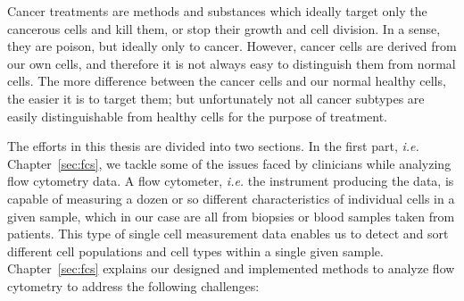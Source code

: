 Cancer treatments are methods and substances which ideally target only the
cancerous cells and kill them, or stop their growth and cell division. In a
sense, they are poison, but ideally only to cancer. However, cancer cells are
derived from our own cells, and therefore it is not always easy to distinguish
them from normal cells. The more difference between the cancer cells and our
normal healthy cells, the easier it is to target them; but unfortunately not
all cancer subtypes are easily distinguishable from healthy cells for the
purpose of treatment.

The efforts in this thesis are divided into two sections. In the first part,
\emph{i.e.} Chapter~\ref{sec:fcs}, we tackle some of the issues faced by
clinicians while analyzing flow cytometry data. A flow cytometer, \emph{i.e.}
the instrument producing the data, is capable of measuring a dozen or so
different characteristics of individual cells in a given sample, which in our
case are all from biopsies or blood samples taken from patients. This type of
single cell measurement data enables us to detect and sort different cell
populations and cell types within a single given sample. Chapter~\ref{sec:fcs}
explains our designed and implemented methods to analyze flow cytometry to
address the following challenges:

